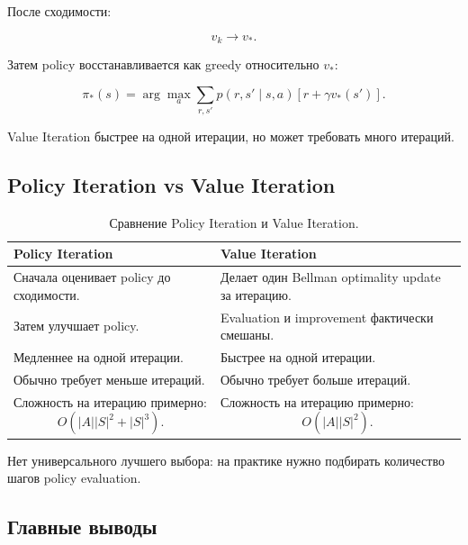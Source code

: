 \documentclass[a4paper,12pt]{article}
\begin{document}
После сходимости:

\[
v_k \rightarrow v_*.
\]

Затем policy восстанавливается как greedy относительно \(v_*\):

\[
\pi_*(s)
=
\arg\max_a
\sum_{r,s'}
p(r,s'\mid s,a)
\left[
r + \gamma v_*(s')
\right].
\]

Value Iteration быстрее на одной итерации, но может требовать много итераций.

\subsection{Policy Iteration vs Value Iteration}

\begin{table}[H]
\centering
\begin{tabular}{p{} p{}}
\toprule
\textbf{Policy Iteration} & \textbf{Value Iteration} \\
\midrule
Сначала оценивает policy до сходимости. &
Делает один Bellman optimality update за итерацию. \\

Затем улучшает policy. &
Evaluation и improvement фактически смешаны. \\

Медленнее на одной итерации. &
Быстрее на одной итерации. \\

Обычно требует меньше итераций. &
Обычно требует больше итераций. \\

Сложность на итерацию примерно:
\[
O(|A||S|^2 + |S|^3).
\]
&
Сложность на итерацию примерно:
\[
O(|A||S|^2).
\]
\\
\bottomrule
\end{tabular}
\caption{Сравнение Policy Iteration и Value Iteration.}
\end{table}

Нет универсального лучшего выбора: на практике нужно подбирать количество шагов policy evaluation.

\subsection{Главные выводы}
\end{document}
